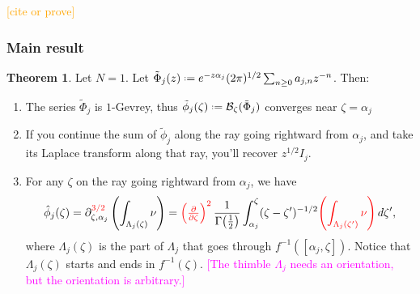 \documentclass{article}
\theoremstyle{definition}
\newcommand{\series}[1]{\tilde{#1}}
\newcommand{\fracderiv}[3]{\partial^{#1}_{#2, #3}}
\newcommand*{\defeq}{\mathrel{\vcenter{\baselineskip0.5ex \lineskiplimit0pt
                     \hbox{\scriptsize.}\hbox{\scriptsize.}}}%
                     =}
\newcommand{\borel}{\mathcal{B}}
\newtheorem{theorem}{Theorem}[section]
\begin{document}
\textcolor{orange}{[cite or prove]}

\subsubsection{Main result}
\begin{theorem}\label{thm:maxim} Let $N=1$. Let $\tilde{\Phi}_{j}(z)\defeq e^{-z\alpha_j}(2\pi)^{1/2} \sum_{n\geq 0}a_{j,n}z^{-n}$. Then:
\begin{enumerate}
\item\label{int:series-gevrey} The series $\tilde{\Phi}_j$ is $1$-Gevrey, thus $\series{\phi}_j(\zeta)\defeq\borel_\zeta(\tilde{\Phi}_j)$ converges near $\zeta=\alpha_j$
\item\label{int:resum-valid} If you continue the sum of $\tilde{\phi}_j$ along the ray going rightward from $\alpha_j$, and take its Laplace transform along that ray, you'll recover $z^{1/2} I_j$.
\item\label{int:deriv-formula} For any $\zeta$ on the ray going rightward from $\alpha_j$, we have
\begin{multline}\label{formula1}
\hat{\phi}_{j}(\zeta)=\fracderiv{\textcolor{red}{3/2}}{\zeta} {\alpha_j} \left( \int_{\Lambda_j(\zeta)}\nu \right)=\textcolor{red}{\left(\tfrac{\partial}{\partial \zeta}\right)^2}\,\frac{1}{\Gamma\big(\tfrac{1}{2}\big)} \int_{\alpha_j}^\zeta (\zeta-\zeta')^{-1/2} \textcolor{red}{\left( \int_{\Lambda_j(\zeta')} \nu \right)}\,d\zeta',
\end{multline}
where $\Lambda_j(\zeta)$ is the part of $\Lambda_j$ that goes through $f^{-1}([\alpha_j, \zeta])$. Notice that $\Lambda_j(\zeta)$ starts and ends in $f^{-1}(\zeta)$. \textcolor{magenta}{[The thimble $\Lambda_j$ needs an orientation, but the orientation is arbitrary.]}
\end{enumerate}
\end{theorem}
\end{document}
